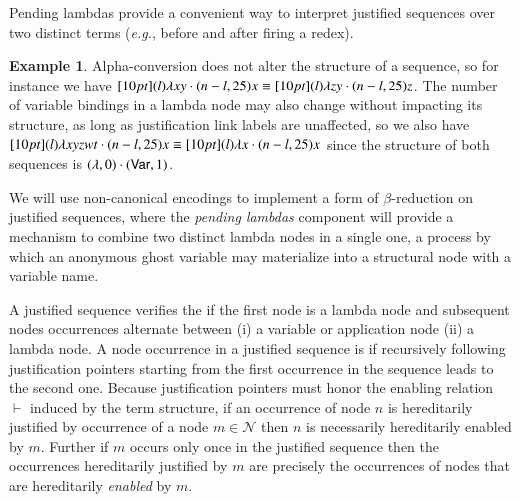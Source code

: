 \documentclass{elsarticle}
\makeatletter
\theoremstyle{plain}
\theoremstyle{definition}
\newtheorem{example}{Example}[section]
\theoremstyle{remark}
\newcommand\Nodes{\mathcal{N}}%
\newcommand{\ghostvar}{\theta}
\newcommand{\enables}{\vdash} %
\renewcommand\eg{{\it e.g.\@\xspace}}
\makeatother
\begin{document}
 Pending lambdas provide a convenient way to interpret justified sequences over two distinct terms (\eg, before and after firing a redex).
 \begin{example}
    Alpha-conversion does not alter the structure of a sequence, so for instance we have $\Pstr[10pt]{ (l){\lambda x y} \cdot (n-l,25){x} } \equiv \Pstr[10pt]{ (l){\lambda z y} \cdot (n-l,25){z}}$. The number of variable bindings in a lambda node may also change without impacting its structure, as long as justification link labels are unaffected, so we also have $\Pstr[10pt]{ (l){\lambda x y z w t} \cdot (n-l,25){x} } \equiv \Pstr[10pt]{ (l){\lambda x} \cdot (n-l,25){x}}$ since the structure of both sequences is $(\lambda,0)\cdot({\sf Var},1)$.
\end{example}

We will use non-canonical encodings to implement a form of $\beta$-reduction on  justified sequences, where the \emph{pending lambdas} component will provide a mechanism to combine two distinct lambda nodes in a single one, a process by which an anonymous ghost variable may materialize into a structural node with a variable name.



A justified sequence verifies the  if the first node is a lambda node and subsequent nodes occurrences alternate between (i) a variable or application node (ii) a lambda node.
A node occurrence in a justified sequence is  if recursively following justification pointers starting from the first occurrence in the sequence leads to the second one. Because justification pointers must honor the enabling relation $\enables$ induced by the term structure, if an occurrence of node $n$ is hereditarily justified by occurrence of a node $m\in\Nodes$ then $n$ is necessarily hereditarily enabled by $m$. Further if $m$ occurs only once in the justified sequence then the occurrences hereditarily justified by $m$ are precisely the occurrences of nodes that are hereditarily \emph{enabled} by $m$.
\end{document}
